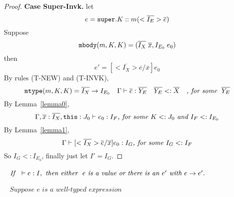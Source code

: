\begin{proof}
\noindent \textbf{Case Super-Invk.}
let \[ e = \texttt{super}.K::m(<\overline{I_E}>\overline{e}) \]   
Suppose \[ \texttt{mbody}(m, K, K) = (\overline{I_X} \; \overline{x}, I_{E_0} \; e_0) \] 
then \[ e' =  [<\overline{I_X}>\overline{e}/\overline{x}] e_0 \] 
By rules (T-NEW) and (T-INVK), 
  \[ 
     \texttt{mtype}(m, K, K) = \overline{I_X} \rightarrow I_{E_0} \quad 
     \Gamma \; {\vdash} \; \overline{e} : \overline{Y_E} \quad
     \overline{Y_E} <: \overline{X} \quad
     \textit{, for some } \; \overline{Y_E}
  \]
By Lemma~\ref{lemma0},
    \[
    \Gamma, \overline{x}:\overline{I_X}, \texttt{this}:J_0 \; {\vdash} \; e_0:I_F \textit{, for some } K <: J_0 \textit{ and } I_F <: I_{E_0}
    \]
By Lemma~\ref{lemma1},
    \[
    \Gamma \; {\vdash} \; [<\overline{I_X}>\overline{e}/\overline{x} ] e_0  :  I_G \textit{, for some } I_G <: I_F 
    \]
So $I_G <: I_{E_0}$, finally just let $I' = I_G$.

\end{proof}

\begin{theorem}[Progress]~\label{theorem_progress}
$\textit{If } \ \; {\vdash} \; e : I, \textit{ then either } \ e 
\textit{ is a value or there is an } e' \textit{ with } e \rightarrow e'.$
\end{theorem}

\begin{theorem}~\label{theorem_soundness}
$\textit{Suppose } e \textit{ is a well-typed expression } $ \\
\end{theorem}